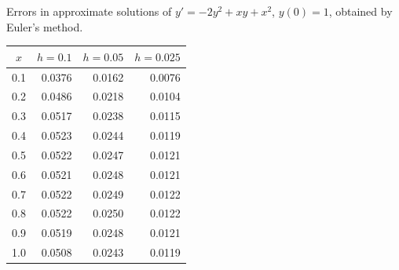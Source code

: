 \begin{examplesolution}
\begin{newtable}
  \label{table:3.1.4} Errors in approximate solutions of $y'=-2y^{2}+xy+x^{2}$, $y(0)=1$, obtained
  by Euler's method.
  \begin{center}
    \begin{tabular}{|c|r|r|r|}
      \hline
      \multicolumn{1}{|c|}{$x$} & \multicolumn{1}{|c|}{$h=0.1$} & \multicolumn{1}{|c|}{$h=0.05$} & \multicolumn{1}{|c|}{$h=0.025$} \\
      \hline
      0.1                       & 0.0376                        & 0.0162                         & 0.0076                          \\
      0.2                       & 0.0486                        & 0.0218                         & 0.0104                          \\
      0.3                       & 0.0517                        & 0.0238                         & 0.0115                          \\
      0.4                       & 0.0523                        & 0.0244                         & 0.0119                          \\
      0.5                       & 0.0522                        & 0.0247                         & 0.0121                          \\
      0.6                       & 0.0521                        & 0.0248                         & 0.0121                          \\
      0.7                       & 0.0522                        & 0.0249                         & 0.0122                          \\
      0.8                       & 0.0522                        & 0.0250                         & 0.0122                          \\
      0.9                       & 0.0519                        & 0.0248                         & 0.0121                          \\
      1.0                       & 0.0508                        & 0.0243                         & 0.0119                          \\
      \hline
    \end{tabular}
  \end{center}
\end{newtable}
\end{examplesolution}


